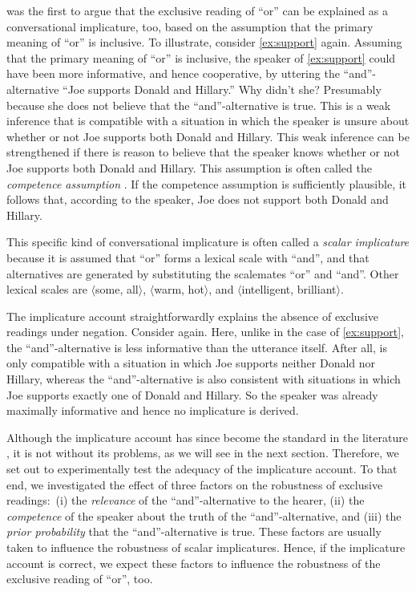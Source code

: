 \documentclass[12pt]{article}
\begin{document}
\citet{horn1972} was the first to argue that the exclusive reading of ``or'' can be explained as
a conversational implicature, too, based on the assumption that the primary meaning of ``or'' is
inclusive. To illustrate, consider \ref{ex:support} again. Assuming that the primary meaning of
``or'' is inclusive, the speaker of \ref{ex:support} could have been more informative, and hence
cooperative, by uttering the ``and''-alternative ``Joe supports Donald and Hillary.'' Why didn't
she? Presumably because she does not believe that the ``and''-alternative is true. This is a weak
inference that is compatible with a situation in which the speaker is unsure about whether or
not Joe supports both Donald and Hillary. This weak inference can be strengthened if there is
reason to believe that the speaker knows whether or not Joe supports both Donald and
Hillary. This assumption is often called the \emph{competence assumption}
\citep[e.g.,][]{geurts2010, Russell2006:Against-Grammat, vanRooijSchulz:ExhaustiveInterpretation, ZimmermannFreeChoiceDisjunction2000}. If
the competence assumption is sufficiently plausible, it follows that, according to the speaker,
Joe does not support both Donald and Hillary.

This specific kind of conversational implicature is often called a \emph{scalar implicature} because it is assumed that ``or'' forms a lexical scale with ``and'', and that alternatives are generated by substituting the scalemates ``or'' and ``and''. Other lexical scales are $\langle$some, all$\rangle$, $\langle$warm, hot$\rangle$, and $\langle$intelligent, brilliant$\rangle$.

The implicature account straightforwardly explains the absence of exclusive readings under
negation. Consider \LLast again. Here, unlike in the case of \ref{ex:support}, the
``and''-alternative is less informative than the utterance itself. After all, \LLast is only
compatible with a situation in which Joe supports neither Donald nor Hillary, whereas the
``and''-alternative is also consistent with situations in which Joe supports exactly one of
Donald and Hillary. So the speaker was already maximally informative and hence no implicature
is derived.

Although the implicature account has since become the standard in the literature
\citep[e.g.,][]{chevallier2008, chierchia2012, geurts2010, sauerland2004}, it is not
without its problems, as we will see in the next section. Therefore, we set out to
experimentally test the adequacy of the implicature account. To that end, we investigated the
effect of three factors on the robustness of exclusive readings:\ (i) the \emph{relevance} of
the ``and''-alternative to the hearer, (ii) the \emph{competence} of the speaker about the truth
of the ``and''-alternative, and (iii) the \emph{prior probability} that the ``and''-alternative is
true. These factors are usually taken to influence the robustness of scalar
implicatures. Hence, if the implicature account is correct, we expect these factors to
influence the robustness of the exclusive reading of ``or'', too.
\end{document}

